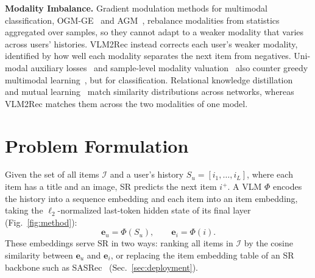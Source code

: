 \vspace{+0.1cm}
\noindent\textbf{Modality Imbalance.}
Gradient modulation methods for multimodal classification, OGM-GE~\cite{modality_balancing_OGM-GE_1} and AGM~\cite{modality_balancing_AGM_2}, rebalance modalities from statistics aggregated over samples, so they cannot adapt to a weaker modality that varies across users' histories.
VLM2Rec instead corrects each user's weaker modality, identified by how well each modality separates the next item from negatives.
Uni-modal auxiliary losses~\cite{modality_gap_gen1} and sample-level modality valuation~\cite{modality_balancing_sample_3} also counter greedy multimodal learning~\cite{modality_gap_gen3}, but for classification.
Relational knowledge distillation~\cite{rkd} and mutual learning~\cite{dml} match similarity distributions across networks, whereas VLM2Rec matches them across the two modalities of one model.

\newcommand{\texttoken}[1]{%
  \begingroup\setlength{\fboxsep}{1.5pt}\colorbox{textblue}{\vphantom{Ag}#1}\endgroup%
}
\newcommand{\imgtoken}[1]{%
  \begingroup\setlength{\fboxsep}{1.5pt}\colorbox{imgorange}{\vphantom{Ag}#1}\endgroup%
}

\section{Problem Formulation}
\label{sec:pre}

Given the set of all items $\mathcal{I}$ and a user's history $S_u=[i_1,\dots,i_L]$, where each item has a title and an image, SR predicts the next item $i^+$.
A VLM $\Phi$ encodes the history into a sequence embedding and each item into an item embedding, taking the $\ell_2$-normalized last-token hidden state of its final layer (Fig.~\ref{fig:method}):
\begin{equation}
\mathbf{e}_u=\Phi(S_u),\qquad \mathbf{e}_i=\Phi(i).
\label{eq:vlm_embed}
\end{equation}
These embeddings serve SR in two ways: ranking all items in $\mathcal{I}$ by the cosine similarity between $\mathbf{e}_u$ and $\mathbf{e}_i$, or replacing the item embedding table of an SR backbone such as SASRec~\cite{sasrec} (Sec.~\ref{sec:deployment}).

